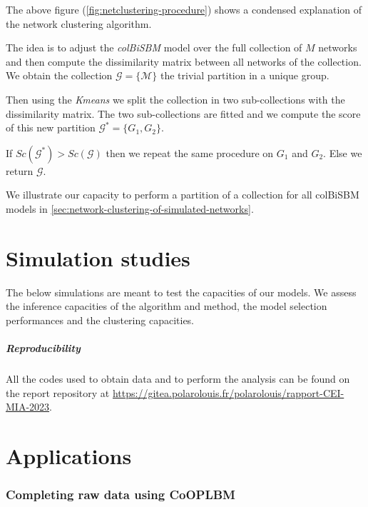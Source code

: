 \documentclass[12pt,a4paper]{report}
\begin{document}
The above figure (\ref{fig:netclustering-procedure}) shows a condensed
explanation of the network clustering algorithm.

The idea is to adjust the \emph{colBiSBM} model over the full collection of $M$
networks and then compute the dissimilarity matrix between all networks of the
collection. We obtain the collection $\mathcal{G} = \{\mathcal{M}\}$ the trivial
partition in a unique group.

Then using the \emph{Kmeans} we split the collection in two sub-collections with
the dissimilarity matrix. The two sub-collections are fitted and we compute
the score of this new partition $\mathcal{G}^{*} = \{G_1, G_2\}$.

If $Sc(\mathcal{G}^{*}) > Sc(\mathcal{G})$ then we repeat the same procedure on
$G_1$ and $G_2$. Else we return $\mathcal{G}$.

We illustrate our capacity to perform a partition of a collection for all
colBiSBM models in \ref{sec:network-clustering-of-simulated-networks}.

\chapter{Simulation studies}\label{chap:simulation-studies}

The below simulations are meant to test the capacities of our models.
We assess the inference capacities of the algorithm and method, the model
selection performances and the clustering capacities.

\paragraph{Reproducibility} All the codes used to obtain data and to perform the
analysis can be found on the report repository at
\url{https://gitea.polarolouis.fr/polarolouis/rapport-CEI-MIA-2023}.





\chapter{Applications}

\subsection{Completing raw data using CoOPLBM \parencite{anakokDisentanglingStructureEcological2022}}


\printbibliography
\listoffigures
\listoftables
\end{document}

